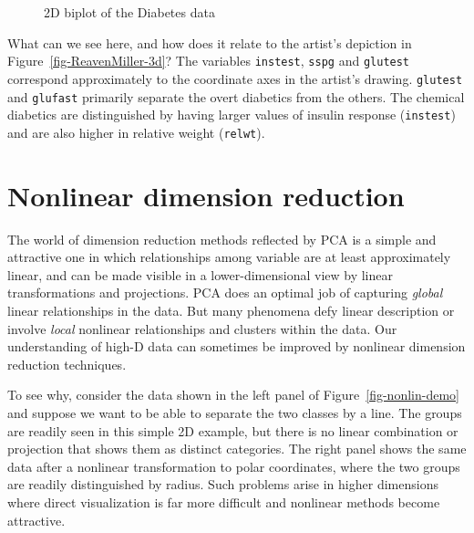 \documentclass[
  letterpaper,
  10pt,
  krantz2]{krantz}
\begin{document}
{\begin{figure}[H]
{}

\caption{\label{fig-diabetes-ggbiplot}2D biplot of the Diabetes data}

\end{figure}%

What can we see here, and how does it relate to the artist's depiction
in Figure~\ref{fig-ReavenMiller-3d}? The variables \texttt{instest},
\texttt{sspg} and \texttt{glutest} correspond approximately to the
coordinate axes in the artist's drawing. \texttt{glutest} and
\texttt{glufast} primarily separate the overt diabetics from the others.
The chemical diabetics are distinguished by having larger values of
insulin response (\texttt{instest}) and are also higher in relative
weight (\texttt{relwt}).

\section{Nonlinear dimension reduction}\label{sec-nonlinear}

The world of dimension reduction methods reflected by PCA is a simple
and attractive one in which relationships among variable are at least
approximately linear, and can be made visible in a lower-dimensional
view by linear transformations and projections. PCA does an optimal job
of capturing \emph{global} linear relationships in the data. But many
phenomena defy linear description or involve \emph{local} nonlinear
relationships and clusters within the data. Our understanding of high-D
data can sometimes be improved by nonlinear dimension reduction
techniques.

To see why, consider the data shown in the left panel of
Figure~\ref{fig-nonlin-demo} and suppose we want to be able to separate
the two classes by a line. The groups are readily seen in this simple 2D
example, but there is no linear combination or projection that shows
them as distinct categories. The right panel shows the same data after a
nonlinear transformation to polar coordinates, where the two groups are
readily distinguished by radius. Such problems arise in higher
dimensions where direct visualization is far more difficult and
nonlinear methods become attractive.

\begin{figure}

\end{figure}}
\end{document}
